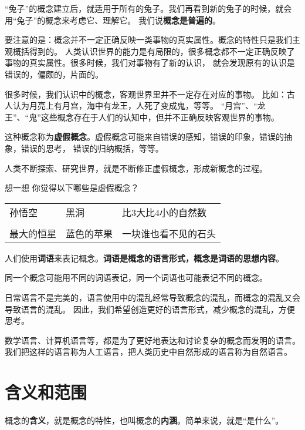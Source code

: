 \documentclass[12pt,UTF8,a4paper]{article}
\begin{document}
“兔子”的概念建立后，就适用于所有的兔子。我们再看到新的兔子的时候，就会用“兔子”的概念来考虑它、理解它。
我们说\textbf{概念是普遍的}。

要注意的是：概念并不一定正确反映一类事物的真实属性。概念的特性只是我们主观概括得到的。
人类认识世界的能力是有局限的，很多概念都不一定正确反映了事物的真实属性。很多时候，我们对事物有了新的认识，
就会发现原有的认识是错误的，偏颇的，片面的。

很多时候，我们认识中的概念，客观世界里并不一定存在对应的事物。
比如：古人认为月亮上有月宫，海中有龙王，人死了变成鬼，等等。
“月宫”、“龙王”、“鬼”这些概念存在于人们的认知中，但并不正确反映客观世界的事物。

这种概念称为\textbf{虚假概念}。虚假概念可能来自错误的感知，错误的印象，错误的抽象，错误的思考，
错误的归纳概括，等等。

人类不断探索、研究世界，就是不断修正虚假概念，形成新概念的过程。

\begin{blockaft}{想一想}
    你觉得以下哪些是虚假概念？\\
    \begin{center}
        \begin{tabular}{p{8em}<{\centering} p{8em}<{\centering} p{12em}<{\centering} }
            孙悟空 & 黑洞 & 比$3$大比$4$小的自然数 \\
            & & \\
            最大的恒星 & 蓝色的苹果 & 一块谁也看不见的石头 \\
        \end{tabular}
    \end{center}
\end{blockaft}

人们使用\textbf{词语}来表记概念。\textbf{词语是概念的语言形式，概念是词语的思想内容}。

同一个概念可能用不同的词语表记，同一个词语也可能表记不同的概念。

日常语言不是完美的，语言使用中的混乱经常导致概念的混乱，而概念的混乱又会导致语言的混乱。
因此，我们希望创造更好的语言形式，减少概念的混乱，方便思考。

数学语言、计算机语言等，都是为了更好地表达和讨论复杂的概念而发明的语言。
我们把这样的语言称为人工语言，把人类历史中自然形成的语言称为自然语言。

\section{含义和范围}

概念的\textbf{含义}，就是概念的特性，也叫概念的\textbf{内涵}。简单来说，就是“是什么”。
\end{document}
